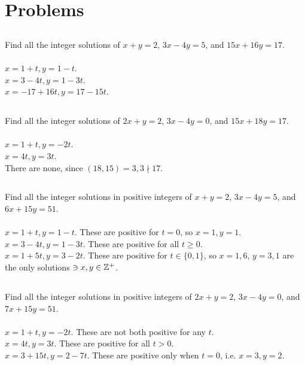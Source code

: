 \documentclass{article}
\begin{document}
\section{Problems}

\subsection{}
Find all the integer solutions of $x + y = 2$, $3x - 4y = 5$, and $15x + 16y = 17$.\\~\\
$x = 1 + t, y = 1 - t$.\\
$x = 3 - 4t, y = 1 - 3t$.\\
$x = -17 + 16t, y = 17 - 15t$.

\subsection{}
Find all the integer solutions of $2x + y = 2$, $3x - 4y = 0$, and $15x + 18y = 17$.\\~\\
$x = 1 + t, y = -2t$.\\
$x = 4t, y = 3t$.\\
There are none, since $(18, 15) = 3, 3 \nmid 17$.

\subsection{}
Find all the integer solutions in positive integers of $x + y = 2$,
$3x - 4y = 5$, and $6x + 15y = 51$.\\~\\
$x = 1 + t, y = 1 - t$. These are positive for $t = 0$, so $x = 1, y = 1$.\\
$x = 3 - 4t, y = 1 - 3t$. These are positive for all $t \geq 0$.\\
$x = 1 + 5t, y = 3 - 2t$. These are positive for $t \in \{0, 1\}$,
so $x = 1, 6$, $y = 3, 1$ are the only solutions $\ni x, y \in \mathbb{Z}^+$.

\subsection{}
Find all the integer solutions in positive integers of $2x + y = 2$,
$3x - 4y = 0$, and $7x + 15y = 51$.\\~\\
$x = 1 + t, y = -2t$. These are not both positive for any $t$.\\
$x = 4t, y = 3t$. These are positive for all $t > 0$.\\
$x = 3 + 15t, y = 2 - 7t$. These are positive only when $t = 0$, i.e. $x = 3, y = 2$.
\end{document}
